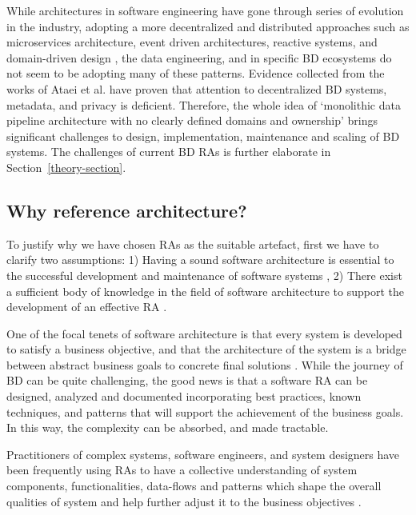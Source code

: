 \documentclass[review]{elsarticle}
\begin{document}
While architectures in software engineering have gone through series of evolution in the industry, adopting a more decentralized and distributed approaches such as microservices architecture, event driven architectures, reactive systems, and domain-driven design \cite{alshuqayran2016systematic}, the data engineering, and in specific BD ecosystems do not seem to be adopting many of these patterns. Evidence collected from the works of Ataei et al. \cite{ataei2022state} have proven that attention to decentralized BD systems, metadata, and privacy is deficient. Therefore, the whole idea of `monolithic data pipeline architecture with no clearly defined domains and ownership' brings significant challenges to design, implementation, maintenance and scaling of BD systems. The challenges of current BD RAs is further elaborate in Section~\ref{theory-section}.


\subsection{Why reference architecture?}

To justify why we have chosen RAs as the suitable artefact, first we have to clarify two assumptions: 1) Having a sound software architecture is essential to the successful development and maintenance of software systems \cite{SoftwareArchitectureKazman}, 2) There exist a sufficient body of knowledge in the field of software architecture to support the development of an effective RA \cite{AtaeiACIS}.


One of the focal tenets of software architecture is that every system is developed to satisfy a business objective, and that the architecture of the system is a bridge between abstract business goals to concrete final solutions \cite{SoftwareArchitectureKazman}. While the journey of BD can be quite challenging, the good news is that a software RA can be designed, analyzed and documented incorporating best practices, known techniques, and patterns that will support the achievement of the business goals. In this way, the complexity can be absorbed, and made tractable.

Practitioners of complex systems, software engineers, and system designers have been frequently using RAs to have a collective understanding of system components, functionalities, data-flows and patterns which shape the overall qualities of system and help further adjust it to the business objectives \cite{Cloutier,kohler2019towards}. 
\end{document}
